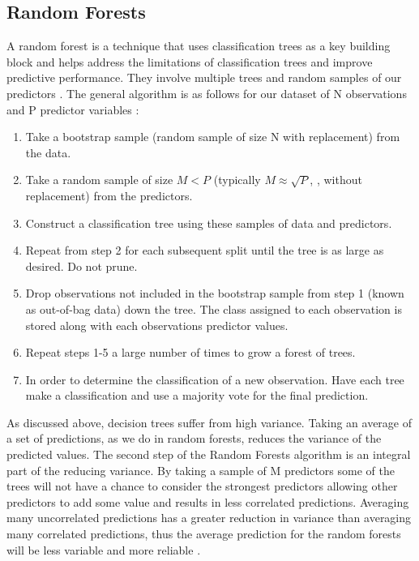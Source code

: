 \documentclass[11pt,a4paper]{article}
\begin{document}
\subsection{Random Forests}

A random forest is a technique that uses classification trees as a key building block and helps address the limitations of classification trees and improve predictive performance. They involve multiple trees and random samples of our predictors \citep{berk08}.
The general algorithm is as follows for our dataset of N observations and P predictor variables \citep{berk08, varian14}:
\begin{enumerate}
  \item Take a bootstrap sample (random sample of size N with replacement) from the data.
  \item Take a random sample of size $M < P$ (typically $M \approx \sqrt{P}$, \cite{james13}, without replacement) from the predictors.
  \item Construct a classification tree using these samples of data and predictors.
  \item Repeat from step 2 for each subsequent split until the tree is as large as desired. Do not prune.
  \item Drop observations not included in the bootstrap sample from step 1 (known as out-of-bag data) down the tree. The class assigned to each observation is stored along with each observations predictor values.
  \item Repeat steps 1-5 a large number of times to grow a forest of trees.
  \item In order to determine the classification of a new observation. Have each tree make a classification and use a majority vote for the final prediction.
\end{enumerate}

As discussed above, decision trees suffer from high variance. Taking an average of a set of predictions, as we do in random forests, reduces the variance of the predicted values. The second step of the Random Forests algorithm is an integral part of the reducing variance. By taking a sample of M predictors some of the trees will not have a chance to consider the strongest predictors allowing other predictors to add some value and results in less correlated predictions. Averaging many uncorrelated predictions has a greater reduction in variance than averaging many correlated predictions, thus the average prediction for the random forests will be less variable and more reliable \citep{james13}.
\end{document}
